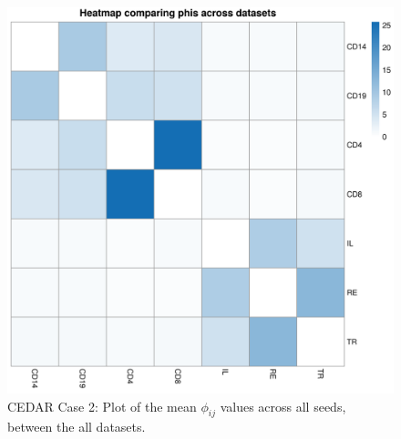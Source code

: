 \documentclass[12pt]{article} %
\begin{document}
	\begin{figure}[h]
		\centering
		\includegraphics[scale=0.75]{Images/Biology_data/Set_1000/All_datasets/Phi_heatmap_1.png}
		\caption{CEDAR Case 2: Plot of the mean $\phi_{ij}$ values across all seeds, between the all datasets.}
		\label{fig:results:cedar_2:mdi_phi_heatmap}
	\end{figure}
	
	
	
	
\end{document}
